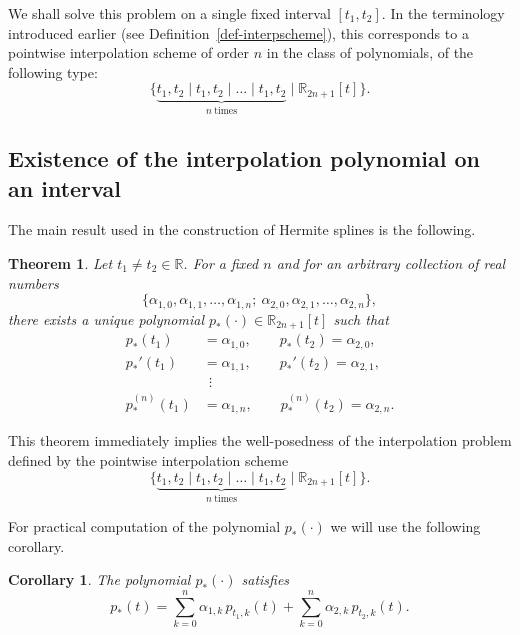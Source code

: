 \documentclass{article}
\newtheorem{theorem}{Theorem}[section]
\newtheorem{corollary}{Corollary}[theorem]
\theoremstyle{definition}
\theoremstyle{definition}
\numberwithin{figure}{section}
\newcommand{\1}{\mathbf{1}}
\begin{document}
We shall solve this problem on a single fixed interval $[t_1, t_2]$. In the terminology introduced earlier (see Definition~\ref{def-interpscheme}), this corresponds to a pointwise interpolation scheme of order $n$ in the class of polynomials, of the following type:
\[
    \{\underbrace{t_1, t_2 \mid t_1, t_2 \mid \ldots \mid t_1, t_2}_{n\ \text{times}} 
    \mid \mathbb{R}_{2n+1}[t]\}.
\]

\subsection{Existence of the interpolation polynomial on an interval}

The main result used in the construction of Hermite splines is the following.

\begin{theorem}\label{th-Rnt1t2}
    Let $t_1 \neq t_2 \in \mathbb{R}$. For a fixed $n$ and for an arbitrary collection of real numbers
    \[
        \{\alpha_{1,0}, \alpha_{1,1}, \dots, \alpha_{1,n};\ \alpha_{2,0}, \alpha_{2,1}, \dots, \alpha_{2,n}\},
    \]
    there exists a unique polynomial $p_*(\cdot) \in \mathbb{R}_{2n+1}[t]$ such that
    \begin{align*}
        p_*(t_1) &= \alpha_{1,0},\qquad p_*(t_2) = \alpha_{2,0},\\
        p_*'(t_1) &= \alpha_{1,1},\qquad p_*'(t_2) = \alpha_{2,1},\\
        &\ \ \vdots \\
        p_*^{(n)}(t_1) &= \alpha_{1,n},\qquad p_*^{(n)}(t_2) = \alpha_{2,n}.
    \end{align*}
\end{theorem}

This theorem immediately implies the well-posedness of the interpolation problem defined by the pointwise interpolation scheme
\[
    \{\underbrace{t_1, t_2 \mid t_1, t_2 \mid \ldots \mid t_1, t_2}_{n\ \text{times}} \mid \mathbb{R}_{2n+1}[t]\}.
\]

For practical computation of the polynomial $p_*(\cdot)$ we will use the following corollary.

\begin{corollary}
    The polynomial $p_*(\cdot)$ satisfies
    \begin{equation}\label{eq-p_*Rn}
        p_*(t) = 
        \sum_{k=0}^{n} \alpha_{1,k}\, p_{t_1,k}(t)
        + 
        \sum_{k=0}^{n} \alpha_{2,k}\, p_{t_2,k}(t).
    \end{equation}
\end{corollary}
\end{document}
